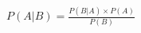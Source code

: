 \documentclass[preview]{standalone}
\begin{document}
\begin{align*}
P(A|B) = \frac{P(B|A) \times P(A)}{P(B)}
\end{align*}
\end{document}
